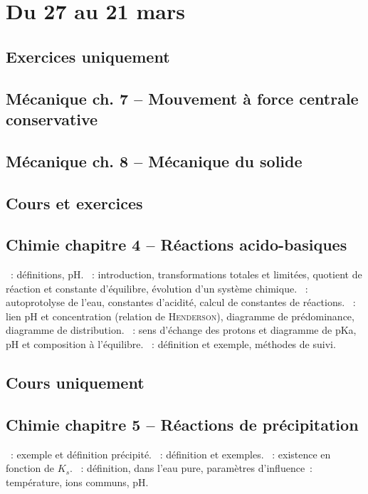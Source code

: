 \documentclass[a4paper, 12pt, final, garamond]{book}
\begin{document}
\setcounter{chapter}{22}

\chapter{Du 27 au 21 mars}

\section{Exercices uniquement}
\section*{Mécanique ch. 7 -- Mouvement à force centrale conservative}
\section*{Mécanique ch. 8 -- Mécanique du solide}

\section{Cours et exercices}
\section*{Chimie chapitre 4 -- Réactions acido-basiques}
\begin{enumerate}[label=\Roman*]
    ~: définitions, pH.
    ~: introduction, transformations totales et
        limitées, quotient de réaction et constante d'équilibre, évolution d'un
        système chimique.
    ~: autoprotolyse de l'eau, constantes
        d'acidité, calcul de constantes de réactions.
    ~: lien pH et concentration
        (relation de \textsc{Henderson}), diagramme de prédominance, diagramme
        de distribution.
    ~: sens d'échange des
        protons et diagramme de pKa, pH et composition à l'équilibre.
    ~: définition et exemple, méthodes de suivi.
\end{enumerate}

\section{Cours uniquement}
\section*{Chimie chapitre 5 -- Réactions de précipitation}
\begin{enumerate}[label=\Roman*]
    ~: exemple et définition précipité.
    ~: définition et exemples.
    ~: existence en fonction de $K_s$.
    ~: définition, dans l'eau pure, paramètres d'influence~:
        température, ions communs, pH.
\end{enumerate}
\end{document}
